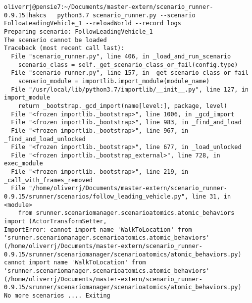 \begin{lstlisting}[caption={Error message when running the the strictly enhanced  FollowLeadingVehicle scenario with halluciantion. }, label={lst:hallucinatedFollowErrorStrict}]
oliverrj@pensie7:~/Documents/master-extern/scenario_runner-0.9.15|hakcs   python3.7 scenario_runner.py --scenario FollowLeadingVehicle_1 --reloadWorld --record logs
Preparing scenario: FollowLeadingVehicle_1
The scenario cannot be loaded
Traceback (most recent call last):
  File "scenario_runner.py", line 406, in _load_and_run_scenario
    scenario_class = self._get_scenario_class_or_fail(config.type)
  File "scenario_runner.py", line 157, in _get_scenario_class_or_fail
    scenario_module = importlib.import_module(module_name)
  File "/usr/local/lib/python3.7/importlib/__init__.py", line 127, in import_module
    return _bootstrap._gcd_import(name[level:], package, level)
  File "<frozen importlib._bootstrap>", line 1006, in _gcd_import
  File "<frozen importlib._bootstrap>", line 983, in _find_and_load
  File "<frozen importlib._bootstrap>", line 967, in _find_and_load_unlocked
  File "<frozen importlib._bootstrap>", line 677, in _load_unlocked
  File "<frozen importlib._bootstrap_external>", line 728, in exec_module
  File "<frozen importlib._bootstrap>", line 219, in _call_with_frames_removed
  File "/home/oliverrj/Documents/master-extern/scenario_runner-0.9.15/srunner/scenarios/follow_leading_vehicle.py", line 31, in <module>
    from srunner.scenariomanager.scenarioatomics.atomic_behaviors import (ActorTransformSetter,
ImportError: cannot import name 'WalkToLocation' from 'srunner.scenariomanager.scenarioatomics.atomic_behaviors' (/home/oliverrj/Documents/master-extern/scenario_runner-0.9.15/srunner/scenariomanager/scenarioatomics/atomic_behaviors.py)
cannot import name 'WalkToLocation' from 'srunner.scenariomanager.scenarioatomics.atomic_behaviors' (/home/oliverrj/Documents/master-extern/scenario_runner-0.9.15/srunner/scenariomanager/scenarioatomics/atomic_behaviors.py)
No more scenarios .... Exiting

\end{lstlisting}
